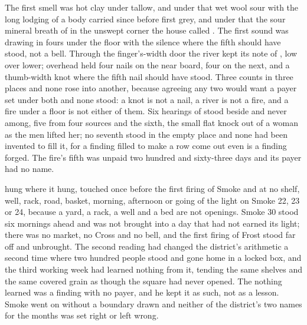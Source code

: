 The first smell was hot clay under tallow, and under that wet wool sour with the long lodging of a body carried since before first grey, and under that the sour mineral breath of  in the unswept corner the house called . The first sound was  drawing in fours under the floor with the silence where the fifth should have stood, not a bell. Through the finger's-width door the river kept its note of , low over lower; overhead  held four nails on the near board, four on the next, and a thumb-width knot where the fifth nail should have stood. Three counts in three places and none rose into another, because agreeing any two would want a payer set under both and none stood: a knot is not a nail, a river is not a fire, and a fire under a floor is not either of them. Six hearings of  stood beside and never among, five from four sources and the sixth, the small flat knock out of a woman as the men lifted her; no seventh stood in the empty place and none had been invented to fill it, for a finding filled to make a row come out even is a finding forged. The fire's fifth was unpaid two hundred and sixty-three days and its payer had no name.

 hung where it hung, touched once before the first firing of Smoke and at no shelf, well, rack, road, basket, morning, afternoon or going of the light on Smoke 22, 23 or 24, because a yard, a rack, a well and a bed are not openings. Smoke 30 stood six mornings ahead and was not brought into a day that had not earned its light; there was no market, no Cross and no bell, and the first firing of Frost stood far off and unbrought. The second reading had changed the district's arithmetic a second time where two hundred people stood and gone home in a locked box, and the third working week had learned nothing from it, tending the same shelves and the same covered grain as though the square had never opened. The nothing learned was a finding with no payer, and he kept it as such, not as a lesson. Smoke went on without a boundary drawn and neither of the district's two names for the months was set right or left wrong.

\scenebreak

